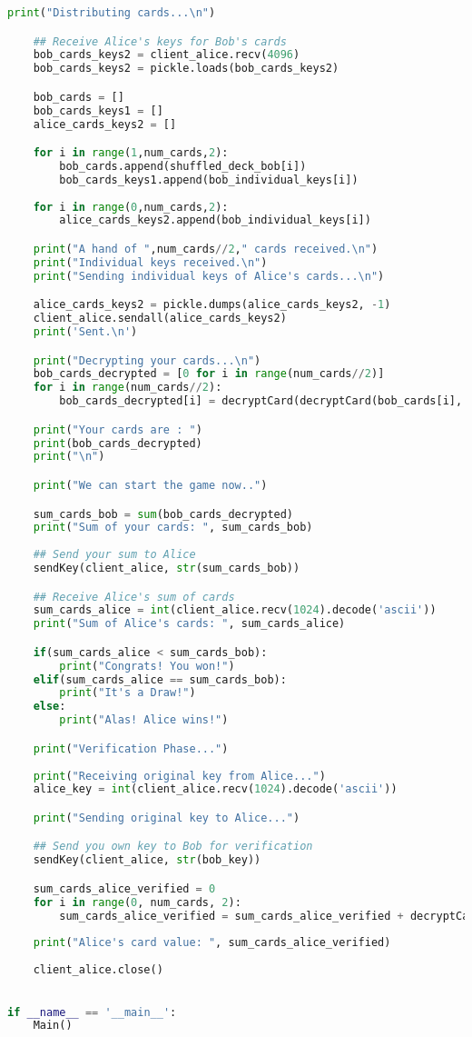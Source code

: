 \documentclass{article}
\begin{document}
\begin{lstlisting}[language=Python, caption=bob.py]
    print("Distributing cards...\n")

    ## Receive Alice's keys for Bob's cards
    bob_cards_keys2 = client_alice.recv(4096)
    bob_cards_keys2 = pickle.loads(bob_cards_keys2)

    bob_cards = []
    bob_cards_keys1 = []
    alice_cards_keys2 = []

    for i in range(1,num_cards,2):
        bob_cards.append(shuffled_deck_bob[i])
        bob_cards_keys1.append(bob_individual_keys[i])
    
    for i in range(0,num_cards,2):
        alice_cards_keys2.append(bob_individual_keys[i])

    print("A hand of ",num_cards//2," cards received.\n")
    print("Individual keys received.\n")
    print("Sending individual keys of Alice's cards...\n")

    alice_cards_keys2 = pickle.dumps(alice_cards_keys2, -1)
    client_alice.sendall(alice_cards_keys2)
    print('Sent.\n')

    print("Decrypting your cards...\n")
    bob_cards_decrypted = [0 for i in range(num_cards//2)]
    for i in range(num_cards//2):
        bob_cards_decrypted[i] = decryptCard(decryptCard(bob_cards[i], bob_cards_keys1[i]), bob_cards_keys2[i])

    print("Your cards are : ")
    print(bob_cards_decrypted)
    print("\n")

    print("We can start the game now..")

    sum_cards_bob = sum(bob_cards_decrypted)
    print("Sum of your cards: ", sum_cards_bob)
    
    ## Send your sum to Alice
    sendKey(client_alice, str(sum_cards_bob))

    ## Receive Alice's sum of cards
    sum_cards_alice = int(client_alice.recv(1024).decode('ascii'))
    print("Sum of Alice's cards: ", sum_cards_alice)

    if(sum_cards_alice < sum_cards_bob):
        print("Congrats! You won!")
    elif(sum_cards_alice == sum_cards_bob):
        print("It's a Draw!")
    else:
        print("Alas! Alice wins!")

    print("Verification Phase...")
    
    print("Receiving original key from Alice...")
    alice_key = int(client_alice.recv(1024).decode('ascii'))

    print("Sending original key to Alice...")

    ## Send you own key to Bob for verification
    sendKey(client_alice, str(bob_key))

    sum_cards_alice_verified = 0
    for i in range(0, num_cards, 2):
        sum_cards_alice_verified = sum_cards_alice_verified + decryptCard(final_deck_before_individual_keys[i], alice_key)
    
    print("Alice's card value: ", sum_cards_alice_verified)
    
    client_alice.close()
   

if __name__ == '__main__':
    Main()
\end{lstlisting}
\end{document}
